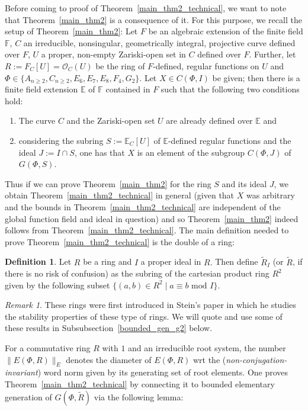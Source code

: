 \documentclass[12pt]{amsart}
\theoremstyle{definition}\newtheorem{definition}[theorem]{Definition}
\theoremstyle{remark}\newtheorem{remark}[theorem]{Remark}
\theoremstyle{definition}\newtheorem{case}{Case}
\begin{document}
Before coming to proof of Theorem~\ref{main_thm2_technical}, we want to note that Theorem~\ref{main_thm2} is a consequence of it. For this purpose, we recall the setup of Theorem~\ref{main_thm2}: Let $F$ be an algebraic extension of the finite field $\mathbb{F}$, $C$ an irreducible, nonsingular, geometrically integral, projective curve defined over $F$, $U$ a proper, non-empty Zariski-open set in $C$ defined over $F$. Further, let $R:=F_C[U]=\mathscr{O}_C(U)$ be the ring of $F$-defined, regular functions on $U$ and $\Phi\in\{A_{n\geq 2},C_{n\geq 2},E_6,E_7,E_8,F_4,G_2\}.$ Let $X\in C(\Phi,I)$ be given; then there is a finite field extension $\mathbb{E}$ of $\mathbb{F}$ contained in $F$ such that the following two conditions hold: 
\begin{enumerate}
\item The curve $C$ and the Zariski-open set $U$ are already defined over $\mathbb{E}$ and
\item considering the subring $S:=\mathbb{E}_C[U]$ of $\mathbb{E}$-defined regular functions and the ideal $J:=I\cap S$, one has that $X$ is an element of the subgroup $C(\Phi,J)$ of $G(\Phi,S).$
\end{enumerate}
Thus if we can prove Theorem~\ref{main_thm2} for the ring $S$ and its ideal $J$, we obtain Theorem~\ref{main_thm2_technical} in general (given that $X$ was arbitrary and the bounds in Theorem~\ref{main_thm2_technical} are independent of the global function field and ideal in question) and so Theorem~\ref{main_thm2} indeed follows from Theorem~\ref{main_thm2_technical}. The main definition needed to prove Theorem~\ref{main_thm2_technical} is the double of a ring:

\begin{definition}
Let $R$ be a ring and $I$ a proper ideal in $R.$ Then define $\tilde{R}_I$ (or $\tilde{R}$, if there is no risk of confusion) as the subring of the cartesian product ring $R^2$ given by the following subset $\{(a,b)\in R^2\mid a\equiv b\text{ mod }I\}.$
\end{definition}

\begin{remark}
These rings were first introduced in Stein's paper \cite{STEIN1971140} in which he studies the stability properties of these type of rings. We will quote and use some of these results in Subsubsection~\ref{bounded_gen_g2} below.
\end{remark}

For a commutative ring $R$ with $1$ and an irreducible root system, the number $\|E(\Phi,R)\|_E$ denotes the diameter of $E(\Phi,R)$ wrt the (\emph{non-conjugation-invariant}) word norm given by its generating set of root elements. One proves Theorem~\ref{main_thm2_technical} by connecting it to bounded elementary generation of $G(\Phi,\tilde{R})$ via the following lemma:
\end{document}
